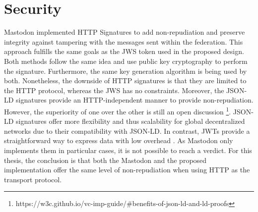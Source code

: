 \section{Security}
Mastodon implemented HTTP Signatures to add non-repudiation and preserve integrity against tampering with the messages sent within the federation. This approach fulfills the same goals as the JWS token used in the proposed design. Both methods follow the same idea and use public key cryptography to perform the signature. Furthermore, the same key generation algorithm is being used by both. Nonetheless, the downside of HTTP signatures is that they are limited to the HTTP protocol, whereas the JWS has no constraints. 
Moreover, the JSON-LD signatures provide an HTTP-independent manner to provide non-repudiation. However, the superiority of one over the other is still an open discussion \footnote{https://w3c.github.io/vc-imp-guide/\#benefits-of-json-ld-and-ld-proofs}. JSON-LD signatures offer more flexibility and thus scalability for global decentralized networks due to their compatibility with JSON-LD. In contrast, JWTs provide a straightforward way to express data with low overhead \cite{chadwick_longley_sporny_terbu_zagidulin_zundel_2022}. As Mastodon only implements them in particular cases, it is not possible to reach a verdict. 
For this thesis, the conclusion is that both the Mastodon and the proposed implementation offer the same level of non-repudiation when using HTTP as the transport protocol. 

